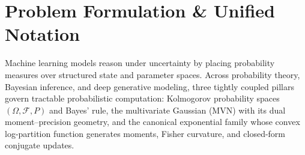 \documentclass[../../../../master.tex]{subfiles}
\begin{document}

\section{Problem Formulation \& Unified Notation}\label{sec:probdist:formulation}

Machine learning models reason under uncertainty by placing probability measures over structured state and parameter spaces. Across probability theory, Bayesian inference, and deep generative modeling, three tightly coupled pillars govern tractable probabilistic computation: Kolmogorov probability spaces $(\Omega, \mathcal{F}, P)$ and Bayes' rule, the multivariate Gaussian (MVN) with its dual moment--precision geometry, and the canonical exponential family whose convex log-partition function generates moments, Fisher curvature, and closed-form conjugate updates.
\end{document}
